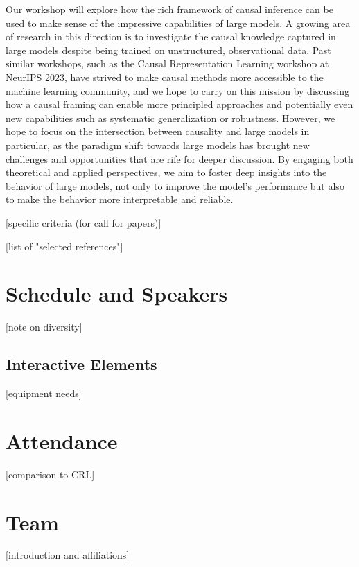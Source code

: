 \documentclass{article}
\begin{document}
Our workshop will explore how the rich framework of causal inference can be used to make sense of the impressive capabilities of large models. 
A growing area of research in this direction is to investigate the causal knowledge captured in large models despite being trained on unstructured, observational data. 
Past similar workshops, such as the Causal Representation Learning workshop at NeurIPS 2023, have strived to make causal methods more accessible to the machine learning community, and we hope to carry on this mission by discussing how a causal framing can enable more principled approaches and potentially even new capabilities such as systematic generalization or robustness. However, we hope to focus on the intersection between causality and large models in particular, as the paradigm shift towards large models has brought new challenges and opportunities that are rife for deeper discussion.
By engaging both theoretical and applied perspectives, we aim to foster deep insights into the behavior of large models, not only to improve the model's performance but also to make the behavior more interpretable and reliable.

[specific criteria (for call for papers)]

[list of "selected references"]

\section{Schedule and Speakers}

[note on diversity]

\subsection{Interactive Elements}

[equipment needs]

\section{Attendance}

[comparison to CRL]

\section{Team}

[introduction and affiliations]
\end{document}
